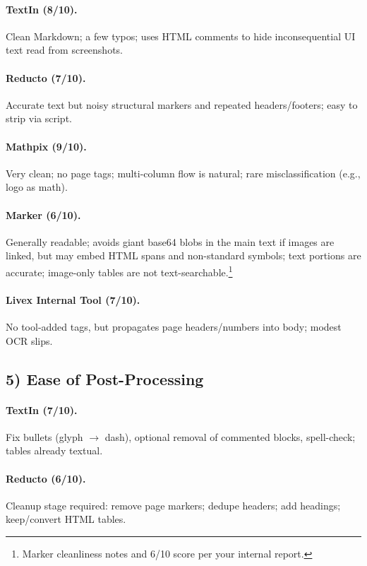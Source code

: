 \documentclass[11pt,a4paper]{article}
\begin{document}
\paragraph{TextIn (8/10).}
Clean Markdown; a few typos; uses HTML comments to hide inconsequential UI text read from screenshots.

\paragraph{Reducto (7/10).}
Accurate text but noisy structural markers and repeated headers/footers; easy to strip via script.

\paragraph{Mathpix (9/10).}
Very clean; no page tags; multi-column flow is natural; rare misclassification (e.g., logo as math).

\paragraph{Marker (6/10).}
Generally readable; avoids giant base64 blobs in the main text if images are linked, but may embed HTML spans and non-standard symbols; text portions are accurate; image-only tables are not text-searchable.\footnote{Marker cleanliness notes and 6/10 score per your internal report.}

\paragraph{Livex Internal Tool (7/10).}
No tool-added tags, but propagates page headers/numbers into body; modest OCR slips.

\subsection*{5) Ease of Post-Processing}

\paragraph{TextIn (7/10).}
Fix bullets (glyph $\to$ dash), optional removal of commented blocks, spell-check; tables already textual.

\paragraph{Reducto (6/10).}
Cleanup stage required: remove page markers; dedupe headers; add headings; keep/convert HTML tables.
\end{document}
